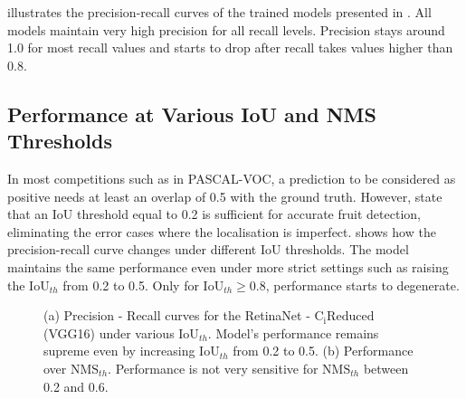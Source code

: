  illustrates the precision-recall curves of the trained models presented in . All models maintain very high precision for all recall levels. Precision stays around 1.0 for most recall values and starts to drop after recall takes values higher than 0.8.

\subsection{Performance at Various IoU  and NMS Thresholds}\label{nms_threshold}
In most competitions such as in PASCAL-VOC, a prediction to be considered as positive needs at least an overlap of 0.5 with the ground truth. However, \cite{bargoti2017deep} state that an IoU threshold equal to 0.2 is sufficient for accurate fruit detection, eliminating the error cases where the localisation is imperfect.  shows how the precision-recall curve changes under different IoU thresholds. The model maintains the same performance even under more strict settings such as raising the $\text{IoU}_{th}$ from 0.2 to 0.5. Only for $\text{IoU}_{th} \geq 0.8$, performance starts to degenerate.

 \begin{figure}[!htb]
  \centering
  \caption{(a) Precision - Recall curves for the RetinaNet - $\text{C}_\text{i}\text{Reduced}$ (VGG16) under various $\text{IoU}_{th}$. Model's performance remains supreme even by increasing  $\text{IoU}_{th}$ from 0.2 to 0.5. (b) Performance over $\text{NMS}_{th}$. Performance is not very sensitive for $\text{NMS}_{th}$ between 0.2 and 0.6.}
  \label{ch5:fig5}
\end{figure}

